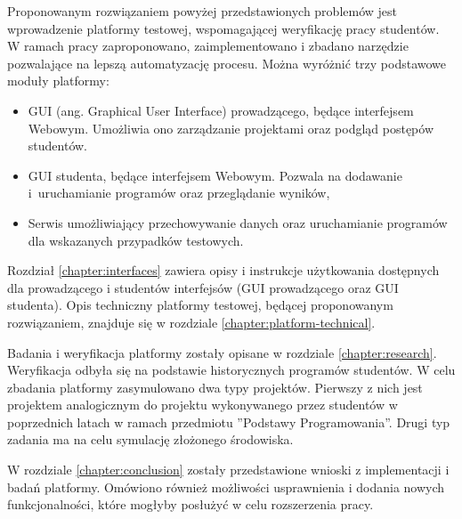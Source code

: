 Proponowanym rozwiązaniem powyżej przedstawionych problemów jest wprowadzenie platformy testowej, wspomagającej weryfikację pracy studentów.
W ramach pracy zaproponowano, zaimplementowano i zbadano narzędzie pozwalające na lepszą automatyzację procesu.
Można wyróżnić trzy podstawowe moduły platformy:
\begin{itemize}
    \item GUI (ang. Graphical User Interface) prowadzącego, będące interfejsem Webowym. Umożliwia ono zarządzanie projektami oraz podgląd postępów studentów.
    \item GUI studenta, będące interfejsem Webowym. Pozwala na dodawanie i~uruchamianie programów oraz przeglądanie wyników,
    \item Serwis umożliwiający przechowywanie danych oraz uruchamianie programów dla wskazanych przypadków testowych.
\end{itemize}
Rozdział \ref{chapter:interfaces} zawiera opisy i instrukcje użytkowania dostępnych dla prowadzącego i studentów interfejsów (GUI prowadzącego oraz GUI studenta).
Opis techniczny platformy testowej, będącej proponowanym rozwiązaniem, znajduje się w rozdziale \ref{chapter:platform-technical}.

Badania i weryfikacja platformy zostały opisane w rozdziale \ref{chapter:research}.
Weryfikacja odbyła się na podstawie historycznych programów studentów.
W celu zbadania platformy zasymulowano dwa typy projektów.
Pierwszy z nich jest projektem analogicznym do projektu wykonywanego przez studentów w poprzednich latach w ramach przedmiotu ”Podstawy Programowania”.
Drugi typ zadania ma na celu symulację złożonego środowiska.

W rozdziale \ref{chapter:conclusion} zostały przedstawione wnioski z implementacji i badań platformy.
Omówiono również możliwości usprawnienia i dodania nowych funkcjonalności, które mogłyby posłużyć w celu rozszerzenia pracy.





